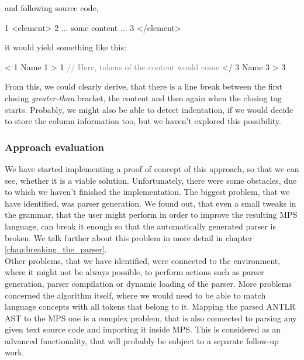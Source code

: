 \noindent
and following source code,

\begin{antlr}
	1   <element>
	2      ... some content ...
	3   </element>
\end{antlr}

\noindent
it would yield something like this:

\begin{antlr}
	<       1
	Name    1
	>       1
	\textcolor{gray}{// Here, tokens of the content would come}
	</      3
	Name    3
	>       3
\end{antlr}

From this, we could clearly derive, that there is a line break between the first closing \textit{greater-than} bracket, the content and then again when the closing tag starts.
Probably, we might also be able to detect indentation, if we would decide to store the column information too, but we haven't explored this possibility.

\subsubsection{Approach evaluation}

We have started implementing a proof of concept of this approach, so that we can see, whether it is a viable solution.
Unfortunately, there were some obstacles, due to which we haven't finished the implementation.
The biggest problem, that we have identified, was parser generation.
We found out, that even a small tweaks in the grammar, that the user might perform in order to improve the resulting MPS language, can break it enough so that the automatically generated parser is broken.
We talk further about this problem in more detail in chapter \ref{chap:breaking_the_parser}.
\\

Other problems, that we have identified, were connected to the environment, where it might not be always possible, to perform actions such as parser generation, parser compilation or dynamic loading of the parser.
More problems concerned the algorithm itself, where we would need to be able to match language concepts with all tokens that belong to it.
Mapping the parsed ANTLR AST to the MPS one is a complex problem, that is also connected to parsing any given text source code and importing it inside MPS.
This is considered as an advanced functionality, that will probably be subject to a separate follow-up work.
\\

